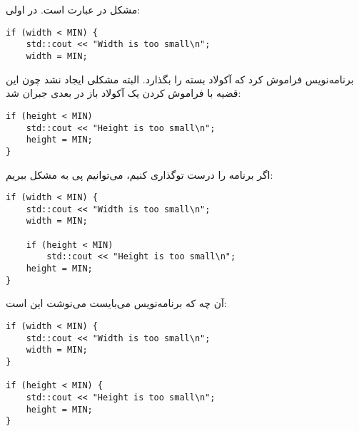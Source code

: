 \section{}
\paragraph{}\label{answer:13}
مشکل در عبارت  است. در اولی:
\begin{LTR}
\begin{lstlisting}[style=C++Style]
if (width < MIN) {
    std::cout << "Width is too small\n";
    width = MIN;
\end{lstlisting}
\end{LTR}

برنامه‌نویس فراموش کرد که آکولاد بسته را بگذارد. البته مشکلی ایجاد نشد چون این قضیه با فراموش کردن یک آکولاد باز در  بعدی جبران شد:
\begin{LTR}
\begin{lstlisting}[style=C++Style]
if (height < MIN)
    std::cout << "Height is too small\n";
    height = MIN;
}
\end{lstlisting}
\end{LTR}

اگر برنامه را درست توگذاری کنیم، می‌توانیم پی به مشکل ببریم:
\begin{LTR}
\begin{lstlisting}[style=C++Style]
if (width < MIN) {
    std::cout << "Width is too small\n";
    width = MIN;

    if (height < MIN)
        std::cout << "Height is too small\n";
    height = MIN;
}
\end{lstlisting}
\end{LTR}

آن چه که برنامه‌نویس می‌بایست می‌نوشت این است:
\begin{LTR}
\begin{lstlisting}[style=C++Style]
if (width < MIN) {
    std::cout << "Width is too small\n";
    width = MIN;
}

if (height < MIN) {
    std::cout << "Height is too small\n";
    height = MIN;
}
\end{lstlisting}
\end{LTR}
